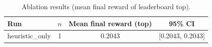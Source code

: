 \begin{table}[t]
\centering
\small
\caption{Ablation results (mean final reward of leaderboard top).}
\label{tab:marl_ablation}
\begin{tabular}{lccc}
\hline
Run & $n$ & Mean final reward (top) & 95\% CI \\
\hline
heuristic_only & 1 & 0.2043 & [0.2043, 0.2043] \\
\hline
\end{tabular}
\end{table}